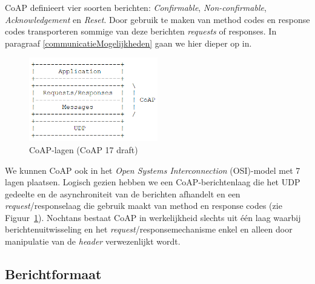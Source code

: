 CoAP definieert vier soorten berichten: \textit{Confirmable}, \textit{Non-confirmable}, \textit{Acknowledgement} en \textit{Reset}. Door gebruik te maken van method codes en response codes transporteren sommige van deze berichten \textit{requests} of responses. In paragraaf \ref{communicatieMogelijkheden} gaan we hier dieper op in.\\

\begin{figure}
\vspace{-10pt}
\includegraphics[width=0.5\textwidth]{fig/CoAPLaag}
\vspace{-30pt}
\caption{CoAP-lagen (CoAP 17 draft)}
\vspace{-5pt}
\label{fig:CoAPLaag}
\end{figure}
We kunnen CoAP ook in het \textit{Open Systems Interconnection} (OSI)-model  met 7 lagen plaatsen. Logisch gezien hebben we een CoAP-berichtenlaag die het UDP gedeelte en de asynchroniteit van de berichten afhandelt en een \textit{request}/responselaag die gebruik maakt van method en response codes (zie Figuur~\ref{fig:CoAPLaag}). Nochtans bestaat CoAP in werkelijkheid slechts uit \'{e}\'{e}n laag waarbij berichtenuitwisseling en het \textit{request}/responsemechanisme enkel en alleen door manipulatie van de \textit{header} verwezenlijkt wordt.

\subsection{Berichtformaat}

